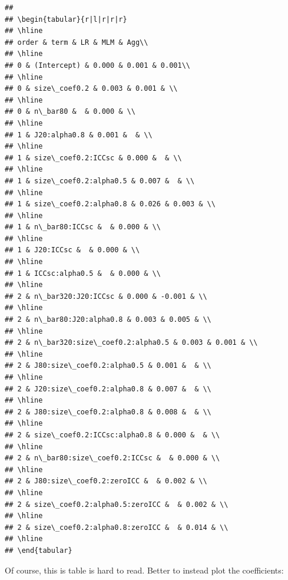 \documentclass[
]{book}
\begin{document}
\begin{verbatim}
## 
## \begin{tabular}{r|l|r|r|r}
## \hline
## order & term & LR & MLM & Agg\\
## \hline
## 0 & (Intercept) & 0.000 & 0.001 & 0.001\\
## \hline
## 0 & size\_coef0.2 & 0.003 & 0.001 & \\
## \hline
## 0 & n\_bar80 &  & 0.000 & \\
## \hline
## 1 & J20:alpha0.8 & 0.001 &  & \\
## \hline
## 1 & size\_coef0.2:ICCsc & 0.000 &  & \\
## \hline
## 1 & size\_coef0.2:alpha0.5 & 0.007 &  & \\
## \hline
## 1 & size\_coef0.2:alpha0.8 & 0.026 & 0.003 & \\
## \hline
## 1 & n\_bar80:ICCsc &  & 0.000 & \\
## \hline
## 1 & J20:ICCsc &  & 0.000 & \\
## \hline
## 1 & ICCsc:alpha0.5 &  & 0.000 & \\
## \hline
## 2 & n\_bar320:J20:ICCsc & 0.000 & -0.001 & \\
## \hline
## 2 & n\_bar80:J20:alpha0.8 & 0.003 & 0.005 & \\
## \hline
## 2 & n\_bar320:size\_coef0.2:alpha0.5 & 0.003 & 0.001 & \\
## \hline
## 2 & J80:size\_coef0.2:alpha0.5 & 0.001 &  & \\
## \hline
## 2 & J20:size\_coef0.2:alpha0.8 & 0.007 &  & \\
## \hline
## 2 & J80:size\_coef0.2:alpha0.8 & 0.008 &  & \\
## \hline
## 2 & size\_coef0.2:ICCsc:alpha0.8 & 0.000 &  & \\
## \hline
## 2 & n\_bar80:size\_coef0.2:ICCsc &  & 0.000 & \\
## \hline
## 2 & J80:size\_coef0.2:zeroICC &  & 0.002 & \\
## \hline
## 2 & size\_coef0.2:alpha0.5:zeroICC &  & 0.002 & \\
## \hline
## 2 & size\_coef0.2:alpha0.8:zeroICC &  & 0.014 & \\
## \hline
## \end{tabular}
\end{verbatim}

Of course, this is table is hard to read. Better to instead plot the coefficients:
\end{document}
